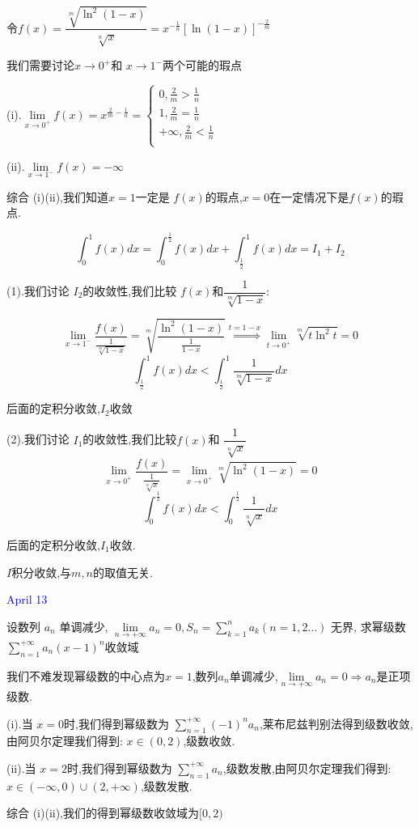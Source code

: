 \begin{solution}
	
	令$f(x)=\dfrac{\sqrt[m]{\ln^{2}(1-x)}}{\sqrt[n]{x}}=x^{-\frac{1}{n}}[\ln(1-x)]^{-\frac{2}{m}}$
	
	我们需要讨论$x\to 0^{+}$和 $x\to 1^{-}$两个可能的瑕点
	
	(i).$\lim\limits_{x\to 0^{+}}f(x)=x^{\frac{2}{m}-\frac{1}{n}}=
	\left\lbrace
	\begin{array}{l}
		0,\frac{2}{m}>\frac{1}{n}\\
		1,\frac{2}{m}=\frac{1}{n}\\
		+\infty,\frac{2}{m}<\frac{1}{n}\\
	\end{array}
	\right. $
	
	(ii).$\lim\limits_{x\to 1^{-}}f(x)=-\infty$
	
	
	综合 (i)(ii),我们知道$x=1$一定是 $f(x)$的瑕点,$x=0$在一定情况下是$f(x)$的瑕点.
	
	$$\int_{0}^{1}f(x)dx=\int_{0}^{\frac{1}{2}}f(x)dx+\int_{\frac{1}{2}}^{1}f(x)dx=I_{1}+I_{2}$$
	
	(1).我们讨论 $I_{2}$的收敛性,我们比较 $f(x)$和$\dfrac{1}{\sqrt[m]{1-x}}$: 
	
	$$\lim\limits_{x\to 1^{-}}\frac{f(x)}{\frac{1}{\sqrt[m]{1-x}}}=\sqrt[m]{\frac{\ln^{2}(1-x)}{\frac{1}{1-x}}}\overset{t=1-x}{\Rightarrow}\lim\limits_{t\to 0^{+}}\sqrt[m]{t\ln^2 t}=0$$
	$$\int_{\frac{1}{2}}^{1}f(x)dx<\int_{\frac{1}{2}}^{1}\frac{1}{\sqrt[m]{1-x}}dx$$
	
	后面的定积分收敛,$I_{2}$收敛
	
	(2).我们讨论 $I_{1}$的收敛性,我们比较$f(x)$和 $\dfrac{1}{\sqrt[n]{x}}$
	$$\lim\limits_{x\to 0^{+}}\frac{f(x)}{\frac{1}{\sqrt[n]{x}}}=\lim\limits_{x\to 0^{+}}\sqrt[m]{\ln^{2}(1-x)}=0$$
	$$\int_{0}^{\frac{1}{2}}f(x)dx<\int_{0}^{\frac{1}{2}}\frac{1}{\sqrt[n]{x}}dx$$
	
	后面的定积分收敛,$I_{1}$收敛.
	
	$I$积分收敛,与$m,n$的取值无关.	
\end{solution}


\textcolor{blue}{April 13}

\begin{example}[][Exam: 30.2.11]
	设数列 ${a_{n}}$ 单调减少, $\lim\limits_{n\to +\infty}a_{n}=0, S_{n}=\sum\limits_{k=1}^{n}a_{k}(n=1,2\dots)$ 无界,
	求幂级数 $\sum\limits_{n=1}^{+\infty}a_{n}(x-1)^{n}$收敛域
\end{example}

\begin{solution}
	
	我们不难发现幂级数的中心点为$x=1$,数列${a_{n}}$单调减少,$\lim\limits_{n\to +\infty}a_{n}=0\Rightarrow a_{n}$是正项级数.
	
	(i).当 $x=0$时,我们得到幂级数为 $\sum\limits_{n=1}^{+\infty}(-1)^na_{n}$,莱布尼兹判别法得到级数收敛,由阿贝尔定理我们得到: $x\in(0,2)$,级数收敛.
	
	(ii).当 $x=2$时,我们得到幂级数为 $\sum\limits_{n=1}^{+\infty}a_{n}$,级数发散,由阿贝尔定理我们得到: $x\in (-\infty,0) \cup (2,+\infty)$,级数发散.
	
	综合 (i)(ii),我们的得到幂级数收敛域为$[0,2)$
\end{solution}

